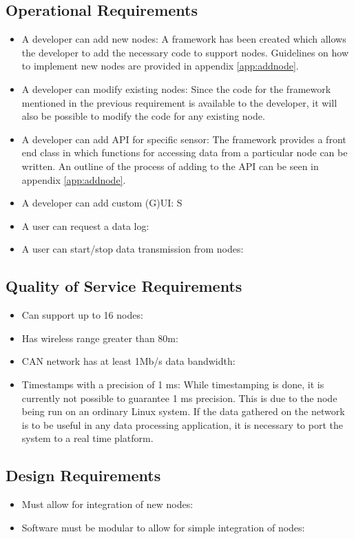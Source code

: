 \subsection{Operational Requirements}
\begin{itemize}
	\item[\cmark] A developer can add new nodes:
	A framework has been created which allows the developer to add the necessary code to support nodes.
	Guidelines on how to implement new nodes are provided in appendix \ref{app:addnode}.
	\item[\cmark] A developer can modify existing nodes:
	Since the code for the framework mentioned in the previous requirement is available to the developer, it will also be possible to modify the code for any existing node.
	\item[\cmark] A developer can add API for specific sensor:
	The framework provides a front end class in which functions for accessing data from a particular node can be written.
	An outline of the process of adding to the API can be seen in appendix \ref{app:addnode}.
	\item[\cmark] A developer can add custom (G)UI:
	S
	\item A user can request a data log:
	\item A user can start/stop data transmission from nodes:
\end{itemize}

\subsection{Quality of Service Requirements}
\begin{itemize}
	\item Can support up to 16 nodes:
	\item Has wireless range greater than 80m:
	\item CAN network has at least 1Mb/s data bandwidth:
	\item[\xmark] Timestamps with a precision of 1 ms:
	While timestamping is done, it is currently not possible to guarantee 1 ms precision.
	This is due to the node being run on an ordinary Linux system.
	If the data gathered on the network is to be useful in any data processing application, it is necessary to port the system to a real time platform.
\end{itemize}

\subsection{Design Requirements}
\begin{itemize}
	\item Must allow for integration of new nodes:
	\item Software must be modular to allow for simple integration of nodes:
\end{itemize}

